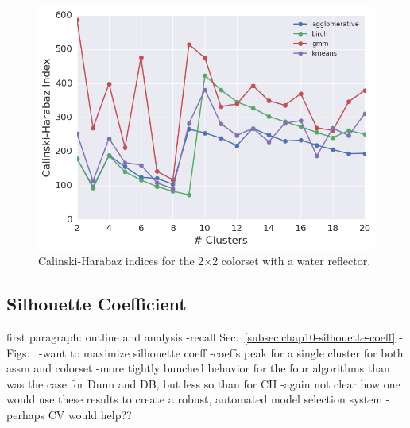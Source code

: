 \begin{figure}[h!]
\centering
\includegraphics[width=0.87\linewidth]{figures/results/model-select/reflector/ch-combined-U238-nu-fission-1}
\vspace{2mm}
\caption[Calinski-Harabaz indices for the 2$\times$2 colorset with reflector]{Calinski-Harabaz indices for the 2$\times$2 colorset with a water reflector.}
\label{fig:chap11-refl-ch-index}
\end{figure}

\subsection{Silhouette Coefficient}
\label{subsec:chap11-silhouette-coeff}

first paragraph: outline and analysis
-recall Sec.~\ref{subsec:chap10-silhouette-coeff}
-Figs.~
-want to maximize silhouette coeff
-coeffs peak for a single cluster for both assm and colorset
-more tightly bunched behavior for the four algorithms than was the case for Dunn and DB, but less so than for CH
-again not clear how one would use these results to create a robust, automated model selection system
  -perhaps CV would help??

